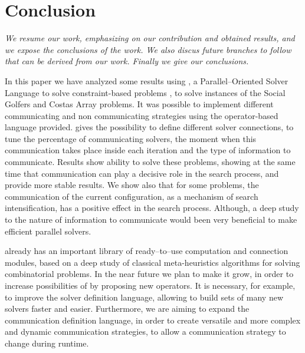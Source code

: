 \chapter{Conclusion}
\label{chap:conclusion}
\textit{We resume our work, emphasizing on our contribution and obtained results, and we expose the conclusions of the work. We also discus future branches to follow that can be derived from our work. Finally we give our conclusions.}
\vfill
\minitoc
\newpage

In this paper we have analyzed some results using \posl{}, a Parallel--Oriented Solver Language to solve constraint-based problems \cite{Reyes-amaro, ale2015mic}, to solve instances of the Social Golfers and Costas Array problems. It was possible to implement different communicating and non communicating strategies using the operator-based language provided. \posl{} gives the possibility to define different solver connections, to tune the percentage of communicating solvers, the moment when this communication takes place inside each iteration and the type of information to communicate. Results show \posl{} ability to solve these problems, showing at the same time that communication can play a decisive role in the search process, and provide more stable results. We show also that for some problems, the communication of the current configuration, as a mechanism of search intensification, has a positive effect in the search process. Although, a deep study to the nature of information to communicate would been very beneficial to make efficient parallel solvers. 

\posl{} already has an important library of ready--to--use computation and connection modules, based on a deep study of classical meta-heuristics algorithms for solving combinatorial problems. In the near future we plan to make it grow, in order to increase possibilities of \posl{} %
by proposing new operators. It is necessary, for example, to improve the solver definition language, allowing to build sets of many new solvers faster and easier. Furthermore, we are aiming to expand the communication definition language, in order to create versatile and more complex and dynamic communication strategies, to allow a communication strategy to change during runtime.



